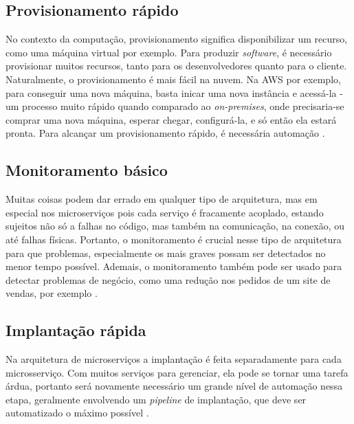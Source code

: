 
\subsection{Provisionamento rápido}\label{boas-praticas-provisionamento-rapido}

No contexto da computação, provisionamento significa disponibilizar um recurso, como uma máquina virtual por exemplo. Para produzir \emph{software}, é necessário provisionar muitos recursos, tanto para os desenvolvedores quanto para o cliente. Naturalmente, o provisionamento é mais fácil na nuvem. Na AWS por exemplo, para conseguir uma nova máquina, basta inicar uma nova instância e acessá-la - um processo muito rápido quando comparado ao \emph{on-premises}, onde precisaria-se comprar uma nova máquina, esperar chegar, configurá-la, e só então ela estará pronta. Para alcançar um provisionamento rápido, é necessária automação \cite{martin-fowler-microservice-prereq}.

\subsection{Monitoramento básico}\label{boas-praticas-monitoramento-basico}

Muitas coisas podem dar errado em qualquer tipo de arquitetura, mas em especial nos microserviços pois cada serviço é fracamente acoplado, estando sujeitos não só a falhas no código, mas também na comunicação, na conexão, ou até falhas físicas. Portanto, o monitoramento é crucial nesse tipo de arquitetura para que problemas, especialmente os mais graves possam ser detectados no menor tempo possível. Ademais, o monitoramento também pode ser usado para detectar problemas de negócio, como uma redução nos pedidos de um site de vendas, por exemplo \cite{martin-fowler-microservice-prereq}.

\subsection{Implantação rápida}\label{boas-praticas-implantacao-rapida}

Na arquitetura de microserviços a implantação é feita separadamente para cada microsserviço. Com muitos serviços para gerenciar, ela pode se tornar uma tarefa árdua, portanto será novamente necessário um grande nível de automação nessa etapa, geralmente envolvendo um \emph{pipeline} de implantação, que deve ser automatizado o máximo possível \cite{martin-fowler-microservice-prereq}.


